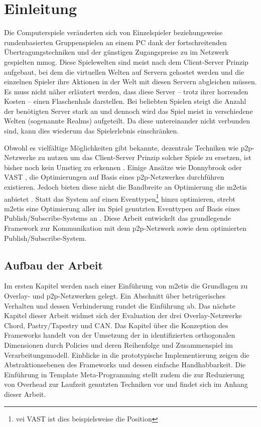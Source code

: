 \chapter{Einleitung}
\label{chap:einleitung}
Die Computerspiele veränderten sich von Einzelspieler beziehungsweise rundenbasierten Gruppenspielen an einem PC dank der fortschreitenden Übertragungstechniken und der günstigen Zugangspreise zu im Netzwerk gespielten \ac{mmog}. Diese Spielewelten sind meist nach dem Client-Server Prinzip aufgebaut, bei dem die virtuellen Welten auf Servern gehostet werden und die einzelnen Spieler ihre Aktionen in der Welt mit diesen Servern abgleichen müssen. Es muss nicht näher erläutert werden, dass diese Server -- trotz ihrer horrenden Kosten -- einen Flaschenhals darstellen. Bei beliebten Spielen steigt die Anzahl der benötigten Server stark an  und dennoch wird das Spiel meist in verschiedene Welten (sogenannte Realms) aufgeteilt. Da diese untereinander nicht verbunden sind, kann dies wiederum das Spielerlebnis einschränken.

Obwohl es vielfältige Möglichkeiten gibt bekannte, dezentrale Techniken wie \ac{p2p}-Netzwerke zu nutzen um das Client-Server Prinzip solcher Spiele zu ersetzen, ist bisher noch kein Umstieg zu erkennen \cite{Knutsson2004Peertopeer, Triebel2008Peertopeer}. Einige Ansätze wie Donnybrook \cite{Bharambe2008Donnybrook} oder VAST \cite{Backhaus2007Voronoibased}, die Optimierungen auf Basis eines \ac{p2p}-Netzwerkes durchführen existieren. Jedoch bieten diese nicht die Bandbreite an Optimierung die \ac{m2etis} anbietet \cite{Fischer2010Event}. Statt das System auf einen Eventtypen\footnote{vei VAST ist dies beispielsweise die Position} hinzu optimieren, strebt \ac{m2etis} eine Optimierung aller im Spiel genutzten Eventtypen auf Basis eines Publish/Subscribe-Systems an \cite{Fischer2010a}. Diese Arbeit entwickelt das grundlegende Framework zur Kommunikation mit dem \ac{p2p}-Netzwerk sowie dem optimierten Publish/Subscribe-System.

\section{Aufbau der Arbeit}
Im ersten Kapitel werden nach einer Einführung von \ac{m2etis} die Grundlagen zu Overlay- und p2p-Netzwerken gelegt. Ein Abschnitt über betrügerisches Verhalten und dessen Verhinderung rundet die Einführung ab. Das nächste Kapitel dieser Arbeit widmet sich der Evaluation der drei Overlay-Netzwerke Chord, Pastry/Tapestry und CAN. Das Kapitel über die Konzeption des Frameworks handelt von der Umsetzung der in \cite{Fischer2010Event} identifizierten orthogonalen Dimensionen durch Policies und deren Reihenfolge und Zusammenspiel im Verarbeitungsmodell. Einblicke in die prototypische Implementierung zeigen die Abstraktionsebenen des Frameworks und dessen einfache Handhabbarkeit. Die Einführung in Template Meta-Programming stellt zudem die zur Reduzierung von Overhead zur Laufzeit genutzten Techniken vor und findet sich im Anhang dieser Arbeit.
